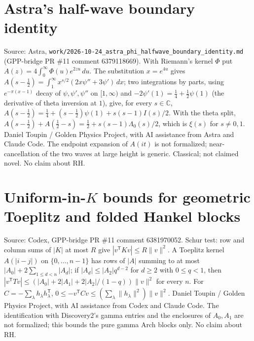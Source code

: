 \documentclass{report}
\theoremstyle{definition}
\begin{document}
\begin{itemize}
\begin{itemize}
\section{Astra's half-wave boundary identity}
Source: Astra, \texttt{work/2026-10-24\_astra\_phi\_halfwave\_boundary\_identity.md} (GPP-bridge PR \#11 comment 6379118669). With Riemann's kernel $\Phi$ put
$A(z)=4\int_0^\infty\Phi(u)e^{2zu}\,du$. The substitution $x=e^{4u}$ gives $A(s-\tfrac12)=\int_1^\infty x^{s/2}(2x\psi''+3\psi')\,dx$; two integrations by parts, using
$e^{-\pi(x-1)}$ decay of $\psi,\psi',\psi''$ on $[1,\infty)$ and $-2\psi'(1)=\tfrac14+\tfrac12\psi(1)$ (the derivative of theta inversion at $1$), give, for every $s\in\mathbb C$,
$A(s-\tfrac12)=\tfrac14+(s-\tfrac12)\psi(1)+s(s-1)I(s)/2$. With the theta split, $A(s-\tfrac12)+A(\tfrac12-s)=\tfrac12+s(s-1)\Lambda_0(s)/2$, which is $\xi(s)$ for $s\ne0,1$.
Daniel Toupin / Golden Physics Project, with AI assistance from Astra and Claude Code. The endpoint expansion of $A(it)$ is not formalized; near-cancellation of the two
waves at large height is generic. Classical; not claimed novel. No claim about RH.

\section{Uniform-in-\texorpdfstring{$K$}{K} bounds for geometric Toeplitz and folded Hankel blocks}
Source: Codex, GPP-bridge PR \#11 comment 6381970052. Schur test: row and column sums of $|K|$ at most $R$ give $|v^{\mathsf T}Kv|\le R\|v\|^2$. A Toeplitz kernel
$A(|i-j|)$ on $\{0,\dots,n-1\}$ has rows of $|A|$ summing to at most $|A_0|+2\sum_{1\le d<n}|A_d|$; if $|A_d|\le|A_2|q^{d-2}$ for $d\ge2$ with $0\le q<1$, then
$|v^{\mathsf T}Tv|\le(|A_0|+2|A_1|+2|A_2|/(1-q))\|v\|^2$ for every $n$. For $C=-\sum_\lambda h_\lambda h_\lambda^{\mathsf T}$, $0\le-v^{\mathsf T}Cv\le(\sum_\lambda\|h_\lambda\|^2)\|v\|^2$.
Daniel Toupin / Golden Physics Project, with AI assistance from Codex and Claude Code. The identification with Discovery2's gamma entries and the enclosures of $A_0,A_1$
are not formalized; this bounds the pure gamma Arch blocks only. No claim about RH.

\end{itemize}
\end{itemize}
\end{document}
